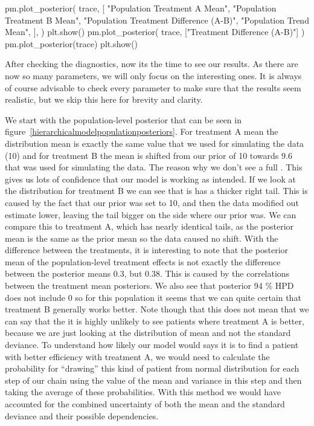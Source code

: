 \documentclass[12pt,a4paper,leqno]{report}
\theoremstyle{plain}
\theoremstyle{definition}
\theoremstyle{remark}
\begin{document}
\bigskip
\begin{pyverbatim}[][fontsize=\footnotesize]
    pm.plot_posterior(
        trace,
        [
            "Population Treatment A Mean",
            "Population Treatment B Mean",
            "Population Treatment Difference (A-B)",
            "Population Trend Mean",
        ],
    )
    plt.show()
    pm.plot_posterior(
        trace, ["Treatment Difference (A-B)"]
    )
    pm.plot_posterior(trace)
    plt.show()
\end{pyverbatim}
\smallskip

After checking the diagnostics, now its the time to see our results. As there are
now so many parameters, we will only focus on the interesting ones. It is always of
course advisable to check every parameter to make sure that the results seem realistic,
but we skip this here for brevity and clarity.

We start with the population-level posterior that can be seen in figure\
\ref{hierarchicalmodelpopulationposteriors}. For treatment A mean the
distribution mean is exactly the same value that we used for simulating the data (10)
and for treatment B the mean is shifted from our prior of 10 towards 9.6 that was used for
simulating the data. The reason why we don't see a full
. This gives us lots of confidence that our
model is working as intended. If we look at the distribution for treatment B we can see
that is has a thicker right tail. This is caused by the fact that our prior was set to
10, and then the data modified out estimate lower, leaving the tail bigger on the side
where our prior was. We can compare this to treatment A, which has nearly identical
tails, as the posterior mean is the same as the prior mean so the data caused no
shift. With the difference between the treatments, it is interesting to note that the
posterior mean of the population-level treatment effects is not exactly the difference
between the posterior means 0.3, but 0.38. This is caused by the correlations between
the treatment mean posteriors. We also see that posterior 94 \% HPD does not include 0
so for this population it seems that we can quite certain that treatment B
generally works better. Note though that this does not mean that we can say that the it is highly
unlikely to see patients where treatment A is better, because we are just looking at the
distribution of mean and not the standard deviance.
To understand how likely our model
would says it is to find a patient with better efficiency with treatment A, we would need
to calculate the probability for ``drawing'' this kind of patient from normal
distribution for each step of our chain using the value of the mean and variance in this
step and then taking the average of these probabilities. With this method we would have
accounted for the combined uncertainty of both the mean and the standard deviance and
their possible dependencies.
\end{document}
